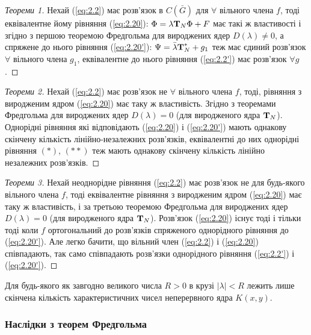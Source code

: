 \begin{proof}[Теореми 1]
	Нехай (\ref{eq:2.2}) має розв'язок в $C(\bar G)$ для $\forall$ вільного члена $f$, тоді еквівалентне йому рівняння (\ref{eq:2.20}): $\Phi = \lambda \bf{T}_N \Phi + F$ має такі ж властивості і згідно з першою теоремою Фредгольма для вироджених ядер $D(\lambda) \ne 0$, а спряжене до нього рівняння (\ref{eq:2.20'}): $\Psi = \bar \lambda \bf{T}_N^* + g_1$ теж має єдиний розв'язок $\forall$ вільного члена $g_1$, еквівалентне до нього рівняння (\ref{eq:2.2'}) має розв'язок $\forall g$.
\end{proof}
\begin{proof}[Теореми 2]
	Нехай (\ref{eq:2.2}) має розв'язок не $\forall$ вільного члена $f$, тоді, рівняння з виродженим ядром (\ref{eq:2.20}) має таку ж властивість. Згідно з теоремами Фредгольма для вироджених ядер $D(\lambda) = 0$ (для виродженого ядра $\bf{T}_N$). Однорідні рівняння які відповідають (\ref{eq:2.20}) і (\ref{eq:2.20'}) мають однакову скінчену кількість лінійно-незалежних розв'язків, еквівалентні до них однорідні рівняння $(*)$, $(**)$ теж мають однакову скінчену кількість лінійно незалежних розв'язків.
\end{proof}
\begin{proof}[Теореми 3]
	Нехай неоднорідне рівняння (\ref{eq:2.2}) має розв'язок не для будь-якого вільного члена $f$, тоді еквівалентне рівняння з виродженим ядром (\ref{eq:2.20}) має таку ж властивість, і за третьою теоремою Фредгольма для вироджених ядер $D(\lambda) = 0$ (для виродженого ядра $\bf{T}_N$). Розв'язок (\ref{eq:2.20}) існує тоді і тільки тоді коли $f$ ортогональний до розв'язків спряженого однорідного рівняння до (\ref{eq:2.20'}). Але легко бачити, що вільний член (\ref{eq:2.2}) і (\ref{eq:2.20}) співпадають, так само співпадають розв'язки однорідного рівняння (\ref{eq:2.2'}) і (\ref{eq:2.20'}).
\end{proof}

\begin{theorem}
	Для будь-якого як завгодно великого числа $R > 0$ в крузі $|\lambda| < R$ лежить лише скінчена кількість характеристичних чисел неперервного ядра $K(x, y)$.
\end{theorem}

\subsubsection*{Наслідки з теорем Фредгольма}


